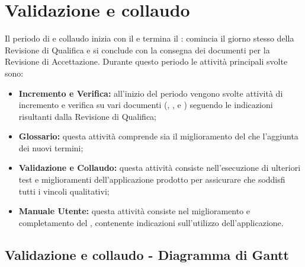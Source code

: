 \documentclass[PianoDiProgetto.tex]{subfiles}
\begin{document}
\section{Validazione e collaudo}
Il periodo di  e collaudo inizia con il  e termina il : comincia il giorno stesso della Revisione di Qualifica e si conclude con la consegna dei documenti per la Revisione di Accettazione. Durante questo periodo le attività principali svolte sono:
\begin{itemize}
\item \textbf{Incremento e Verifica:} all'inizio del periodo vengono svolte attività di incremento e verifica su vari documenti (\ndp, \pdp, \pdq e \pb) seguendo le indicazioni risultanti dalla Revisione di Qualifica;
\item \textbf{Glossario:} questa attività comprende sia il miglioramento del \g che l'aggiunta dei nuovi termini;
\item \textbf{Validazione e Collaudo:} questa attività consiste nell'esecuzione di ulteriori test e miglioramenti dell'applicazione prodotto per assicurare che soddisfi tutti i vincoli qualitativi;
\item \textbf{Manuale Utente:} questa attività consiste nel miglioramento e completamento del \mut, contenente indicazioni sull'utilizzo dell'applicazione.

\end{itemize}
\begin{landscape}
\subsection{Validazione e collaudo - Diagramma di Gantt}
\end{landscape}	
\end{document}
